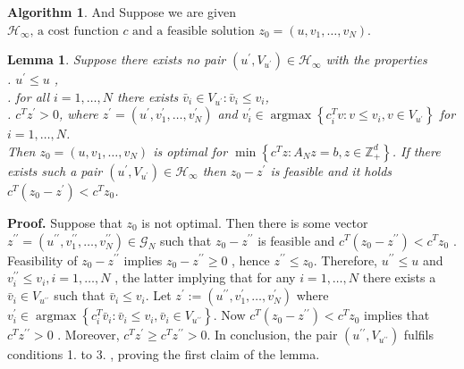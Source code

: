 \documentclass{article}
\theoremstyle{plain}
\newtheorem{lemma}[theorem]{Lemma}
\theoremstyle{definition}
\newtheorem{algorithm}[theorem]{Algorithm}
\begin{document}
\begin{algorithm}
And Suppose we are given $\mathcal{H}_{\infty} \text {, a cost function } c \text { and a feasible solution } z_{0}=\left(u, v_{1}, \ldots, v_{N}\right) $. 

\begin{lemma}Suppose there exists no pair  $\left(u^{\prime}, V_{u^{\prime}}\right) \in \mathcal{H}_{\infty}$  with the properties \\
.  $u^{\prime} \leq u$ , \\
. for all  $i=1, \ldots, N$  there exists  $\bar{v}_{i} \in V_{u^{\prime}}: \bar{v}_{i} \leq v_{i}$, \\
.  $c^{T} z^{\prime}>0$, where  $z^{\prime}=\left(u^{\prime}, v_{1}^{\prime}, \ldots, v_{N}^{\prime}\right)$  and  $v_{i}^{\prime} \in \operatorname{argmax}\left\{c_{i}^{T} v: v \leq v_{i}, v \in V_{u^{\prime}}\right\}$  for  $i=1, \ldots, N$. \\
Then  $z_{0}=\left(u, v_{1}, \ldots, v_{N}\right)$  is optimal for  $\min \left\{c^{T} z: A_{N} z=b, z \in \mathbb{Z}_{+}^{d}\right\}$. If there exists such a pair  $\left(u^{\prime}, V_{u^{\prime}}\right) \in \mathcal{H}_{\infty}$  then $ z_{0}-z^{\prime}$  is feasible and it holds  $c^{T}\left(z_{0}-z^{\prime}\right)<c^{T} z_{0}$. 
\end{lemma}
\noindent\textbf{Proof.} Suppose that  $z_{0}$  is not optimal. Then there is some vector $ z^{\prime \prime}=\left(u^{\prime \prime}, v_{1}^{\prime \prime}, \ldots, v_{N}^{\prime \prime}\right) \in \mathcal{G}_{N}$  such that  $z_{0}-z^{\prime \prime}$  is feasible and  $c^{T}\left(z_{0}-z^{\prime \prime}\right)<c^{T} z_{0}$ . Feasibility of  $z_{0}-z^{\prime \prime}$  implies  $z_{0}-z^{\prime \prime} \geq 0$ , hence  $z^{\prime \prime} \leq z_{0}$. Therefore,  $u^{\prime \prime} \leq u$  and  $v_{i}^{\prime \prime} \leq v_{i}, i=1, \ldots, N$ , the latter implying that for any  $i=1, \ldots, N$  there exists a $ \bar{v}_{i} \in V_{u^{\prime \prime}}$  such that  $\bar{v}_{i} \leq v_{i}$. Let  $z^{\prime}:=\left(u^{\prime \prime}, v_{1}^{\prime}, \ldots, v_{N}^{\prime}\right) $ where $ v_{i}^{\prime} \in \operatorname{argmax}\left\{c_{i}^{T} \bar{v}_{i}: \bar{v}_{i} \leq v_{i}, \bar{v}_{i} \in V_{u^{\prime \prime}}\right\} $.
Now $ c^{T}\left(z_{0}-z^{\prime \prime}\right)<c^{T} z_{0}$  implies that  $ c^{T} z^{\prime \prime}>0$ . Moreover,  $c^{T} z^{\prime} \geq c^{T} z^{\prime \prime}>0$. In conclusion, the pair  $\left(u^{\prime \prime}, V_{u^{\prime \prime}}\right)$  fulfils conditions 1. to 3. , proving the first claim of the lemma.


\end{algorithm}
\end{document}
